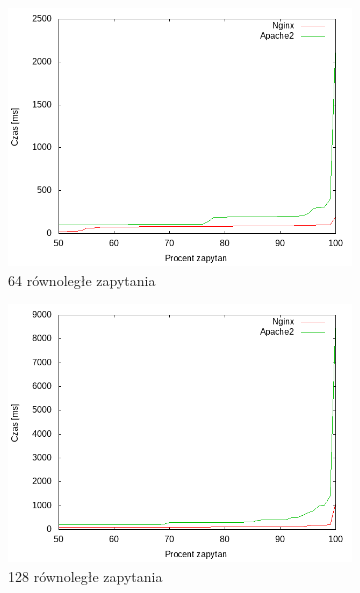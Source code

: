 \begin{figure}
	\begin{subfigure}[h]{0.3\textwidth}
		\includegraphics[width=\textwidth]{testy/wybor_index_maly_64.png}
		\caption{64 równoległe zapytania}
	\end{subfigure}
	\begin{subfigure}[h]{0.3\textwidth}
		\includegraphics[width=\textwidth]{testy/wybor_index_maly_128.png}
		\caption{128 równoległe zapytania}
	\end{subfigure}
	\begin{subfigure}[h]{0.3\textwidth}

\end{subfigure}
\end{figure}
